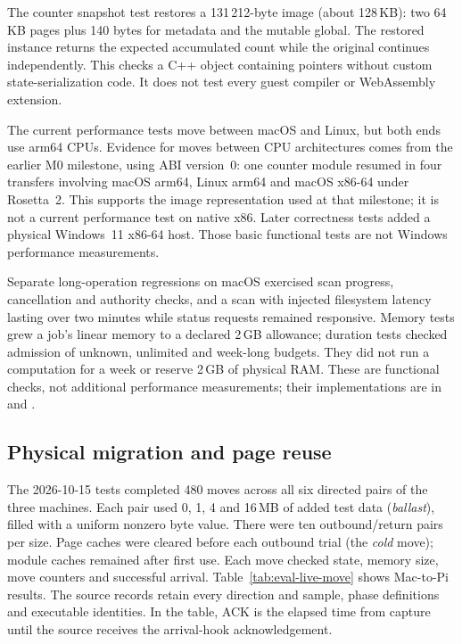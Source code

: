 The counter snapshot test restores a 131\,212-byte image (about 128\,KB):
two 64\,KB pages plus 140 bytes for metadata and the mutable global.
The restored instance returns the expected accumulated count while the
original continues independently. This checks a C++ object containing
pointers without custom state-serialization code. It does not test every
guest compiler or WebAssembly extension.

The current performance tests move between macOS and Linux, but both
ends use arm64 CPUs. Evidence for moves between CPU architectures comes
from the earlier M0 milestone, using ABI version~0: one counter module
resumed in four transfers involving macOS arm64, Linux arm64 and macOS
x86-64 under Rosetta~2. This supports the image representation used at
that milestone; it is not a current performance test on native x86.
Later correctness tests added a physical Windows~11 x86-64 host. Those
basic functional tests are not Windows performance measurements.

Separate long-operation regressions on macOS exercised scan progress,
cancellation and authority checks, and a scan with injected filesystem
latency lasting over two minutes while status requests remained responsive.
Memory tests grew a job's linear memory to a declared 2\,GB allowance;
duration tests checked admission of unknown, unlimited and week-long
budgets. They did not run a computation for a week or reserve 2\,GB of
physical RAM. These are functional checks, not additional performance
measurements; their implementations are in
 and
.

\subsection{Physical migration and page reuse}\label{sec:evaluation-moves}

The 2026-10-15 tests completed 480 moves across all six directed pairs
of the three machines. Each pair used 0, 1, 4 and 16\,MB of added test
data (\emph{ballast}), filled with a uniform nonzero byte value. There
were ten outbound/return pairs per size. Page caches were cleared before
each outbound trial (the \emph{cold} move); module caches remained after
first use. Each move checked state, memory size, move counters and
successful arrival. Table~\ref{tab:eval-live-move} shows Mac-to-Pi results.
The source records retain every direction and sample, phase definitions
and executable identities. In the table, ACK is the elapsed time from
capture until the source receives the arrival-hook acknowledgement.

